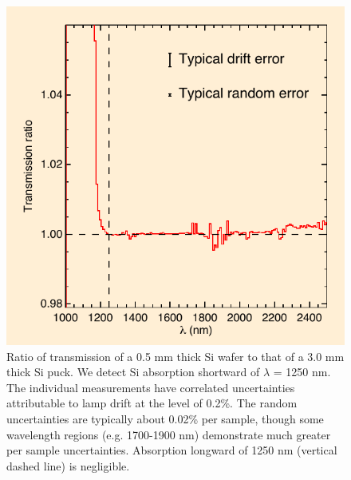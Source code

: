 \begin{figure}[htbp]
\begin{center}
\includegraphics[width=0.60\columnwidth]{chSiGaps/figs/fpAbsorbfig_alt}
\end{center}
\caption[Direct measurement of Si absorption as a function of wavelength]{Ratio of transmission of a 0.5 mm thick Si wafer to that of a 3.0 mm thick Si puck.  \label{figSiAbsorbfig} We detect Si absorption shortward of $\lambda$ = 1250 nm.  The individual measurements have correlated uncertainties attributable to lamp drift at the level of 0.2\%.  The random uncertainties are typically about 0.02\% per sample, though some wavelength regions (e.g. 1700-1900 nm) demonstrate much greater per sample uncertainties.  Absorption longward of 1250 nm (vertical dashed line) is negligible.}
\end{figure}

